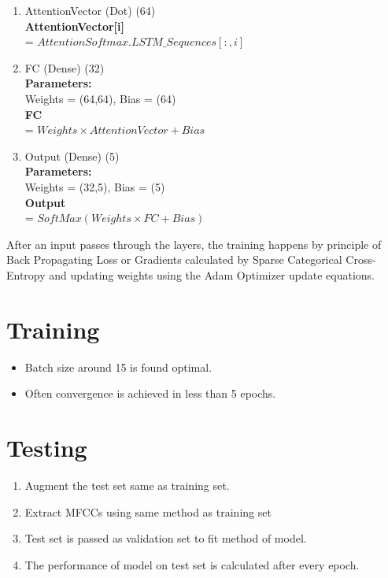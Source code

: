 \documentclass[11pt,english]{article}
\begin{document}
\begin{enumerate}
    \item AttentionVector (Dot)             (64)\\
    \textbf{AttentionVector[i]} \\
    = $AttentionSoftmax . LSTM\_Sequences[:,i]$
    
    \item FC (Dense)                        (32)\\
    \textbf{Parameters:} \\
    Weights = (64,64), Bias = (64)\\     
    \textbf{FC}\\ 
    = $Weights \times AttentionVector + Bias$
    
    \item Output (Dense)                    (5)\\
    \textbf{Parameters:} \\
    Weights = (32,5), Bias = (5)\\
    \textbf{Output} \\
    = $SoftMax(Weights \times FC + Bias)$
    
\end{enumerate}    
After an input passes through the layers, the training happens by principle of Back Propagating Loss or Gradients calculated by Sparse Categorical Cross-Entropy and updating weights using the Adam Optimizer update equations.                                 


\section{Training}
\begin{itemize}
    \item Batch size around 15 is found optimal.
    \item Often convergence is achieved in less than 5 epochs.
\end{itemize}

\section{Testing}
\begin{enumerate}
    \item Augment the test set same as training set.
    \item Extract MFCCs using same method as training set
    \item Test set is passed as validation set to fit method of model.
    \item The performance of model on test set is calculated after every epoch.
\end{enumerate}
\end{document}
